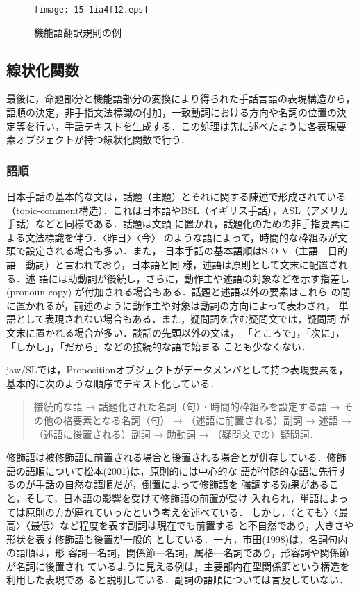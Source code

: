 \documentclass[japanese]{jnlp_1.4}
\begin{document}
\begin{figure}[t]
  \centering
      \texttt{[image: 15-1ia4f12.eps]}
  \caption{機能語翻訳規則の例}
  \label{fig:FWTransRule}
\end{figure}


\subsection{線状化関数}
\label{sec:linearization}

最後に，命題部分と機能語部分の変換により得られた手話言語の表現構造から，
語順の決定，非手指文法標識の付加，一致動詞における方向や名詞の位置の決
定等を行い，手話テキストを生成する．この処理は先に述べたように各表現要
素オブジェクトが持つ線状化関数で行う．



\subsubsection{語順}

日本手話の基本的な文は，話題（主題）とそれに関する陳述で形成されている
（topic-comment構造）．これは日本語やBSL（イギリス手話），ASL（アメリカ
手話）などと同様である\cite{Nakamura2002,Sutton-Spence1999}．話題は文頭
に置かれ，話題化のための非手指要素による文法標識を伴う．〈昨日〉〈今〉
のような語によって，時間的な枠組みが文頭で設定される場合も多い．また，
日本手話の基本語順はS-O-V（主語—目的語—動詞）と言われており，日本語と同
様，述語は原則として文末に配置される\cite{Kimura1995,Matsumoto2001}．述
語には助動詞が後続し，さらに，動作主や述語の対象などを示す指差し
(pronoun copy) が付加される場合もある．話題と述語以外の要素はこれら
の間に置かれるが，前述のように動作主や対象は動詞の方向によって表わされ，
単語として表現されない場合もある．また，疑問詞を含む疑問文では，疑問詞
が文末に置かれる場合が多い\cite{Yonekawa2005}．談話の先頭以外の文は，
「ところで」，「次に」，「しかし」，「だから」などの接続的な語で始まる
ことも少なくない\cite{Tanokami1979}．

jaw/SLでは，Propositionオブジェクトがデータメンバとして持つ表現要素を，
基本的に次のような順序でテキスト化している．

\begin{quote}
  接続的な語
  → 話題化された名詞（句）・時間的枠組みを設定する語
  → その他の格要素となる名詞（句）
  → （述語に前置される）副詞
  → 述語
  → （述語に後置される）副詞
  → 助動詞
  → （疑問文での）疑問詞．
\end{quote}

修飾語は被修飾語に前置される場合と後置される場合とが併存している．修飾
語の語順について松本(2001)\nocite{Matsumoto2001}は，原則的には中心的な
語が付随的な語に先行するのが手話の自然な語順だが，倒置によって修飾語を
強調する効果があること，そして，日本語の影響を受けて修飾語の前置が受け
入れられ，単語によっては原則の方が廃れていったという考えを述べている．
しかし，〈とても〉〈最高〉〈最低〉など程度を表す副詞は現在でも前置する
と不自然であり，大きさや形状を表す修飾語も後置が一般的
としている．一方，市田(1998)\nocite{Ichida1998}は，名詞句内の語順は，形
容詞—名詞，関係節—名詞，属格—名詞であり，形容詞や関係節が名詞に後置され
ているように見える例は，主要部内在型関係節という構造を利用した表現であ
ると説明している．副詞の語順については言及していない．
\end{document}
